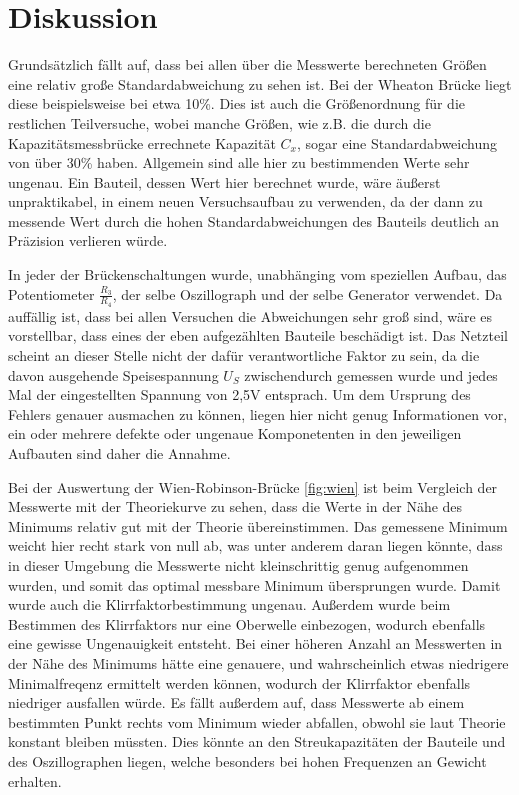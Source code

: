 \section{Diskussion}
\label{sec:Diskussion}

Grundsätzlich fällt auf, dass bei allen über die Messwerte berechneten Größen
eine relativ große Standardabweichung zu sehen ist. Bei der Wheaton Brücke liegt diese
beispielsweise bei etwa 10\%. Dies ist auch die Größenordnung für die restlichen Teilversuche,
wobei manche Größen, wie z.B. die durch die Kapazitätsmessbrücke errechnete Kapazität $C_x$,
sogar eine Standardabweichung von über 30\% haben. Allgemein sind alle hier zu bestimmenden
Werte sehr ungenau. Ein Bauteil, dessen Wert hier berechnet wurde, wäre äußerst unpraktikabel,
in einem neuen Versuchsaufbau zu verwenden, da der dann zu messende Wert durch die hohen Standardabweichungen
des Bauteils deutlich an Präzision verlieren würde. 

In jeder der Brückenschaltungen wurde, unabhänging vom speziellen Aufbau, das Potentiometer $\frac{R_3}{R_4}$,
der selbe Oszillograph und der selbe Generator verwendet. Da auffällig ist, dass bei allen Versuchen die Abweichungen
sehr groß sind, wäre es vorstellbar, dass eines der eben aufgezählten Bauteile beschädigt ist. Das Netzteil scheint an 
dieser Stelle nicht der dafür verantwortliche Faktor zu sein, da die davon ausgehende Speisespannung $U_S$ zwischendurch 
gemessen wurde und jedes Mal der eingestellten Spannung von 2,5\si{\volt} entsprach. Um dem Ursprung des Fehlers genauer 
ausmachen zu können, liegen hier nicht genug Informationen vor, ein oder mehrere defekte oder ungenaue Komponetenten in 
den jeweiligen Aufbauten sind daher die Annahme.

Bei der Auswertung der Wien-Robinson-Brücke \ref{fig:wien} ist beim Vergleich der Messwerte mit der Theoriekurve zu sehen,
dass die Werte in der Nähe des Minimums relativ gut mit der Theorie übereinstimmen. Das gemessene Minimum weicht hier recht stark
von null ab, was unter anderem daran liegen könnte, dass in dieser Umgebung die Messwerte nicht kleinschrittig genug aufgenommen 
wurden, und somit das optimal messbare Minimum übersprungen wurde. Damit wurde auch die Klirrfaktorbestimmung ungenau. Außerdem wurde beim Bestimmen 
des Klirrfaktors nur eine Oberwelle einbezogen, wodurch ebenfalls eine gewisse Ungenauigkeit entsteht.
Bei einer höheren Anzahl an Messwerten in der Nähe des Minimums hätte eine genauere, und wahrscheinlich etwas niedrigere Minimalfreqenz
ermittelt werden können, wodurch der Klirrfaktor ebenfalls niedriger ausfallen würde.  Es fällt außerdem auf, dass Messwerte ab einem bestimmten 
Punkt rechts vom Minimum wieder abfallen, obwohl sie laut Theorie konstant bleiben müssten. Dies könnte an den Streukapazitäten der Bauteile und des Oszillographen liegen, 
welche besonders bei hohen Frequenzen an Gewicht erhalten.

